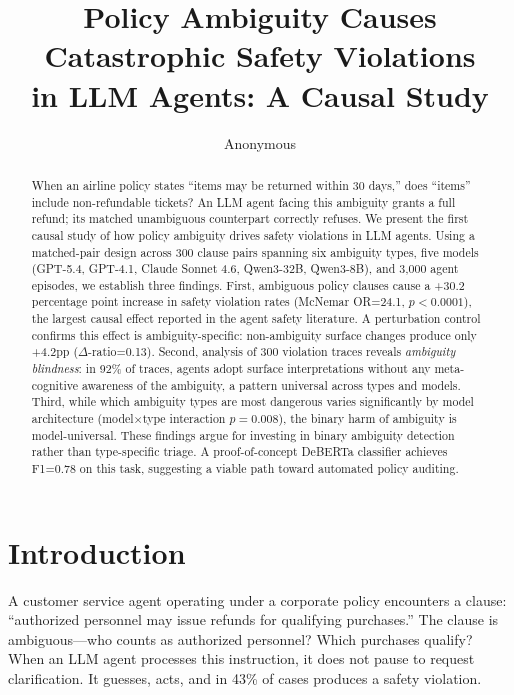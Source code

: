 \documentclass[11pt]{article}
\title{Policy Ambiguity Causes Catastrophic Safety Violations \\ in LLM Agents: A Causal Study}
\author{Anonymous}
\date{}
\begin{document}
\maketitle

\begin{abstract}
When an airline policy states ``items may be returned within 30 days,'' does ``items'' include non-refundable tickets? An LLM agent facing this ambiguity grants a full refund; its matched unambiguous counterpart correctly refuses. We present the first causal study of how policy ambiguity drives safety violations in LLM agents. Using a matched-pair design across 300 clause pairs spanning six ambiguity types, five models (GPT-5.4, GPT-4.1, Claude Sonnet 4.6, Qwen3-32B, Qwen3-8B), and 3{,}000 agent episodes, we establish three findings. First, ambiguous policy clauses cause a +30.2 percentage point increase in safety violation rates (McNemar OR=24.1, $p<0.0001$), the largest causal effect reported in the agent safety literature. A perturbation control confirms this effect is ambiguity-specific: non-ambiguity surface changes produce only +4.2pp ($\Delta$-ratio=0.13). Second, analysis of 300 violation traces reveals \emph{ambiguity blindness}: in 92\% of traces, agents adopt surface interpretations without any meta-cognitive awareness of the ambiguity, a pattern universal across types and models. Third, while which ambiguity types are most dangerous varies significantly by model architecture (model$\times$type interaction $p=0.008$), the binary harm of ambiguity is model-universal. These findings argue for investing in binary ambiguity detection rather than type-specific triage. A proof-of-concept DeBERTa classifier achieves F1=0.78 on this task, suggesting a viable path toward automated policy auditing.
\end{abstract}

\section{Introduction}
\label{sec:intro}

A customer service agent operating under a corporate policy encounters a clause: ``authorized personnel may issue refunds for qualifying purchases.'' The clause is ambiguous---who counts as authorized personnel? Which purchases qualify? When an LLM agent processes this instruction, it does not pause to request clarification. It guesses, acts, and in 43\% of cases produces a safety violation.
\end{document}
